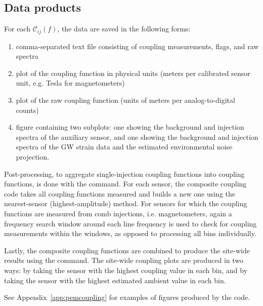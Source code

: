 \subsection{Data products}

For each $\mathcal{C}_{ij}(f)$, the data are saved in the following forms:
\begin{enumerate}
	\item comma-separated text file consisting of coupling measurements, flags, and raw spectra
	\item plot of the coupling function in physical units (meters per calibrated sensor unit, e.g. Tesla for magnetometers)
	\item plot of the  raw coupling function (units of meters per analog-to-digital counts)
	\item figure containing two subplots: one showing the background and injection spectra of the auxiliary sensor, and one showing the background and injection spectra of the \ac{GW} strain data and the estimated environmental noise projection.
\end{enumerate}

Post-processing, to aggregate single-injection coupling functions into coupling functions, is done with the  command.
For each sensor, the composite coupling code takes all coupling functions measured and builds a new one using the nearest-sensor (highest-amplitude) method.
For sensors for which the coupling functions are measured from comb injections, i.e. magnetometers, again a frequency search window around each line frequency is used to check for coupling measurements within the windows, as opposed to processing all bins individually.

Lastly, the composite coupling functions are combined to produce the site-wide results using the  command.
The site-wide coupling plots are produced in two ways: by taking the sensor with the highest coupling value in each bin, and by taking the sensor with the highest estimated ambient value in each bin.

See Appendix~\ref{app:pemcoupling} for examples of figures produced by the \pemcoupling code.
